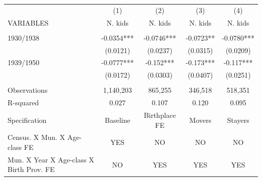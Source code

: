 \begin{tabular}{lcccc} \hline
 & (1) & (2) & (3) & (4) \\
VARIABLES & N. kids & N. kids & N. kids & N. kids \\ \hline
 &  &  &  &  \\
1930/1938 & -0.0354*** & -0.0746*** & -0.0723** & -0.0780*** \\
 & (0.0121) & (0.0237) & (0.0315) & (0.0209) \\
1939/1950 & -0.0777*** & -0.152*** & -0.173*** & -0.117*** \\
 & (0.0172) & (0.0303) & (0.0407) & (0.0251) \\
 &  &  &  &  \\
Observations & 1,140,203 & 865,255 & 346,518 & 518,351 \\
R-squared & 0.027 & 0.107 & 0.120 & 0.095 \\
Specification & Baseline & Birthplace FE & Movers & Stayers \\
Census. X Mun. X Age-class FE & YES & NO & NO & NO \\
 Mun. X Year X Age-class X Birth Prov. FE & NO & YES & YES & YES \\ \hline
\end{tabular}
